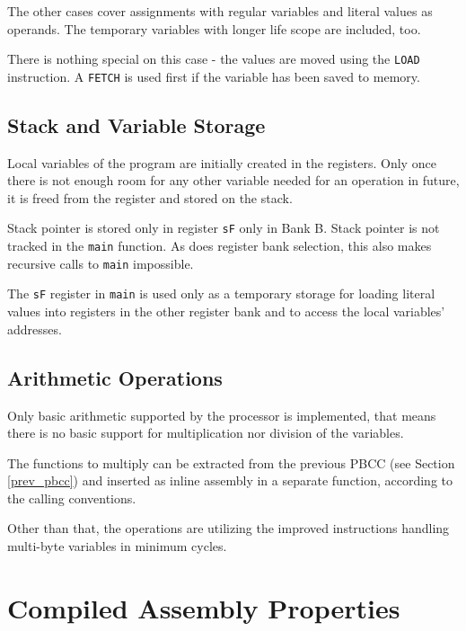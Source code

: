             The other cases cover assignments with regular variables and literal values as operands. The temporary variables with longer life scope are included, too.

            There is nothing special on this case - the values are moved using the \texttt{LOAD} instruction. A \texttt{FETCH} is used first if the variable has been saved to memory.

        \subsection{Stack and Variable Storage}

        Local variables of the program are initially created in the registers. Only once there is not enough room for any other variable needed for an operation in future, it is freed from the register and stored on the stack.

        Stack pointer is stored only in register \texttt{sF} only in Bank B. Stack pointer is not tracked in the \texttt{main} function. As does register bank selection, this also makes recursive calls to \texttt{main} impossible.

        The \texttt{sF} register in \texttt{main} is used only as a temporary storage for loading literal values into registers in the other register bank and to access the local variables' addresses.

        \subsection{Arithmetic Operations}

        Only basic arithmetic supported by the processor is implemented, that means there is no basic support for multiplication nor division of the variables.

        The functions to multiply can be extracted from the previous PBCC (see Section \ref{prev_pbcc}) and inserted as inline assembly in a separate function, according to the calling conventions.

        Other than that, the operations are utilizing the improved instructions handling multi-byte variables in minimum cycles.



    \section{Compiled Assembly Properties}

